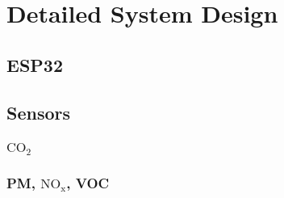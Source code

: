 \chapter{Detailed System Design}
\section{ESP32}

\section{Sensors}
\subsection{$\mathrm{CO_2}$}
\subsection{PM, $\mathrm{NO_x}$, VOC}
